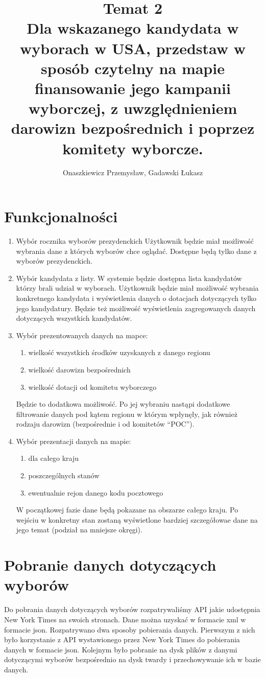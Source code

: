 \documentclass[10pt,a4paper]{article}
\author{Onaszkiewicz Przemysław, Gadawski Łukasz}
\title{Temat 2\\ Dla wskazanego kandydata w wyborach w USA, przedstaw w sposób czytelny na mapie finansowanie jego kampanii wyborczej, z uwzględnieniem darowizn bezpośrednich i poprzez komitety wyborcze. 
}
\begin{document}
\maketitle

\section{Funkcjonalności}
\begin{enumerate}
\item Wybór rocznika wyborów prezydenckich  
Użytkownik będzie miał możliwość wybrania dane z których wyborów chce oglądać. Dostępne będą tylko dane z wyborów prezydenckich.
\item Wybór kandydata z listy. W systemie będzie dostępna lista kandydatów którzy brali udział w wyborach. Użytkownik będzie miał możliwość wybrania konkretnego kandydata i wyświetlenia danych o dotacjach dotyczących tylko jego kandydatury. Będzie też możliwość wyświetlenia zagregowanych danych dotyczących wszystkich kandydatów. 
\item Wybór prezentowanych danych na mapce:
\begin{enumerate}
\item wielkość wszystkich środków uzyskanych z danego regionu 
\item wielkość darowizn bezpośrednich
\item wielkość dotacji od komitetu wyborczego 
\end{enumerate}
 Będzie to dodatkowa możliwość. Po jej wybraniu nastąpi dodatkowe filtrowanie danych pod kątem regionu w którym wpłynęły, jak również rodzaju darowizn (bezpośrednie i od komitetów “POC”).
\item Wybór prezentacji danych na mapie:
\begin{enumerate}
\item dla całego kraju
\item poszczególnych stanów
\item ewentualnie rejon danego kodu pocztowego
\end{enumerate}

W początkowej fazie dane będą pokazane na obszarze całego kraju. Po wejściu w 
konkretny  stan zostaną wyświetlone bardziej szczegółowae dane na jego temat 
(podział na mniejsze okręgi). 

\end{enumerate}
\section{Pobranie danych dotyczących wyborów}
Do pobrania danych dotyczących wyborów rozpatrywaliśmy API jakie udostępnia New York Times na swoich stronach. Dane można uzyskać w formacie xml w formacie json.   
Rozpatrywano dwa sposoby pobierania danych. Pierwszym z nich było korzystanie z API wystawionego przez New York Times  do pobierania danych w formacie json. Kolejnym było pobranie na dysk plików z danymi dotyczącymi wyborów bezpośrednio na dysk twardy i przechowywanie ich w bazie danych.
\end{document}
